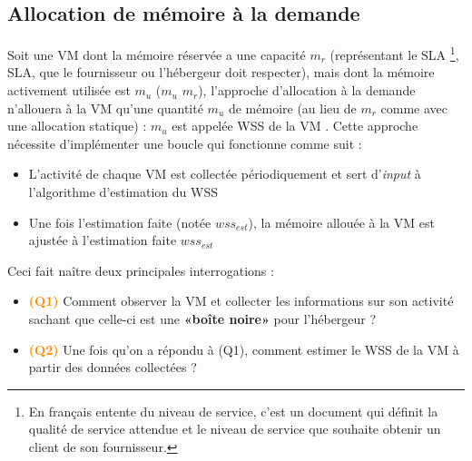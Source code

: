 \subsection{Allocation de mémoire à la demande}
Soit une VM dont la mémoire réservée a une capacité $\textit{m}_\textit{r}$ (représentant le \acs{SLA} \footnote{En français entente du niveau de service, c'est un document qui définit la qualité de service attendue et le niveau de service que souhaite obtenir un client de son fournisseur.}, \acl{SLA}, que le fournisseur ou l'hébergeur doit respecter), mais dont la mémoire activement utilisée est $\textit{m}_\textit{u}$ ($\textit{m}_\textit{u}$ \leq $\textit{m}_\textit{r}$), l'approche d'allocation à la demande n'allouera à la VM qu'une quantité $\textit{m}_\textit{u}$ de mémoire (au lieu de $\textit{m}_\textit{r}$ comme avec une allocation statique) : $\textit{m}_\textit{u}$ est appelée \ac{WSS} de la VM \cite{article9}. Cette approche nécessite d'implémenter une boucle qui fonctionne comme suit :
\begin{itemize}
    \item L'activité de chaque VM est collectée périodiquement et sert d'\textit{input} à l'algorithme d'estimation du WSS
    \item Une fois l'estimation faite (notée $\textit{wss}_\textit{est}$), la mémoire allouée à la VM est ajustée à l'estimation faite $\textit{wss}_\textit{est}$
\end{itemize}
Ceci fait naître deux principales interrogations : 
\begin{itemize}[label=, font=\large \color{darkorange}]
    \item \textbf{\large{\textcolor{darkorange}{(Q1)}}} Comment observer la VM et collecter les informations sur son activité sachant que celle-ci est une \textbf{«boîte noire»} pour l'hébergeur ?\\
    \item \textbf{\large{\textcolor{darkorange}{(Q2)}}} Une fois qu'on a répondu à (Q1), comment estimer le WSS de la VM à partir des données collectées ? \\
\end{itemize}
\par\noindent

